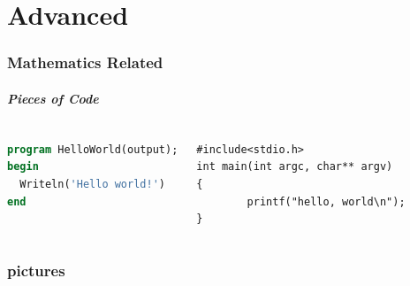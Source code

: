 \documentclass[11pt]{beamer}
\begin{document}
\part{Advanced}
\frame{\partpage}

\section{Mathematics Related}

\begin{frame}[containsverbatim]
\frametitle{Pieces of Code}
\centering{}
\vskip18pt
\begin{columns}
{{\tiny{
\begin{lstlisting}[language={PASCAL},caption= PASCAL code]
program HelloWorld(output);
begin
  Writeln('Hello world!')
end
\end{lstlisting}
}}
}
{\tiny{
\begin{lstlisting}[language={[ANSI]C},caption= C code]
#include<stdio.h>
int main(int argc, char** argv)
{
        printf("hello, world\n");
}
\end{lstlisting}
}}
\end{columns}
\end{frame}

\section{pictures}


% 
\end{document}
